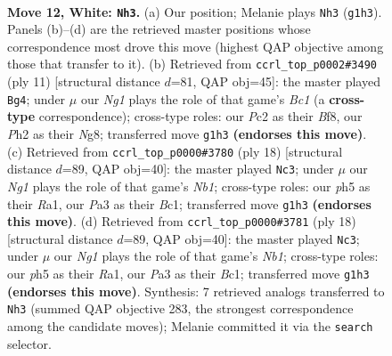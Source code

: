 \documentclass[11pt]{article}
\begin{document}
\clearpage

\begin{figure}[p]\centering
\begin{subfigure}{0.46\textwidth}\centering
\resizebox{\linewidth}{!}{%
\newchessgame
\chessboard[
  setfen={rnbq1k1r/1p2n3/4p3/pQPpPppp/3B4/P1P5/2P2PPP/R3KBNR w KQ - 0 12},
  showmover=false,
  pgfstyle=straightmove, color=movearrow, markmove={g1-h3}
]}
\caption{}
\end{subfigure}\hfill
\begin{subfigure}{0.46\textwidth}\centering
\resizebox{\linewidth}{!}{%
\newchessgame
\chessboard[
  setfen={r1b1kbnr/ppp2ppp/2np4/8/2BPPp1q/2N5/PPP3PP/R1BQ1KNR b kq - 2 6},
  showmover=false,
  pgfstyle=straightmove, color=movearrow, markmove={c8-g4}
]}
\caption{}
\end{subfigure}
\\[4pt]
\begin{subfigure}{0.46\textwidth}\centering
\resizebox{\linewidth}{!}{%
\newchessgame
\chessboard[
  setfen={r3kb1r/pp3ppp/2nqp3/2pn4/8/5QPP/PPPP1PB1/RNB2RK1 w kq - 0 10},
  showmover=false,
  pgfstyle=straightmove, color=movearrow, markmove={b1-c3}
]}
\caption{}
\end{subfigure}\hfill
\begin{subfigure}{0.46\textwidth}\centering
\resizebox{\linewidth}{!}{%
\newchessgame
\chessboard[
  setfen={r3kb1r/pp3ppp/2nqp3/2pn4/8/5QPP/PPPP1PB1/RNB2RK1 w kq - 0 10},
  showmover=false,
  pgfstyle=straightmove, color=movearrow, markmove={b1-c3}
]}
\caption{}
\end{subfigure}
\caption{\textbf{Move 12, White: \texttt{Nh3}.} (a) Our position; Melanie plays \texttt{Nh3} (\texttt{g1h3}). Panels (b)--(d) are the retrieved master positions whose correspondence most drove this move (highest QAP objective among those that transfer to it). (b) Retrieved from \texttt{ccrl\_top\_p0002\#3490} (ply 11) [structural distance $d$=81, QAP obj=45]: the master played \texttt{Bg4}; under $\mu$ our \emph{Ng1} plays the role of that game's \emph{Bc1} (a \textbf{cross-type} correspondence); cross-type roles: our \emph{P}c2 as their \emph{B}f8, our \emph{P}h2 as their \emph{N}g8; transferred move \texttt{g1h3} \textbf{(endorses this move)}. (c) Retrieved from \texttt{ccrl\_top\_p0000\#3780} (ply 18) [structural distance $d$=89, QAP obj=40]: the master played \texttt{Nc3}; under $\mu$ our \emph{Ng1} plays the role of that game's \emph{Nb1}; cross-type roles: our \emph{p}h5 as their \emph{R}a1, our \emph{P}a3 as their \emph{B}c1; transferred move \texttt{g1h3} \textbf{(endorses this move)}. (d) Retrieved from \texttt{ccrl\_top\_p0000\#3781} (ply 18) [structural distance $d$=89, QAP obj=40]: the master played \texttt{Nc3}; under $\mu$ our \emph{Ng1} plays the role of that game's \emph{Nb1}; cross-type roles: our \emph{p}h5 as their \emph{R}a1, our \emph{P}a3 as their \emph{B}c1; transferred move \texttt{g1h3} \textbf{(endorses this move)}. Synthesis: 7 retrieved analogs transferred to \texttt{Nh3} (summed QAP objective 283, the strongest correspondence among the candidate moves); Melanie committed it via the \texttt{search} selector.}
\label{fig:thought-m22}
\end{figure}
\end{document}
